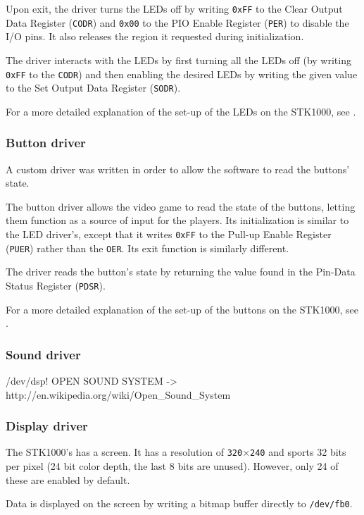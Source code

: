 		Upon exit, the driver turns the LEDs off by writing \texttt{0xFF} to the Clear Output Data Register (\texttt{CODR}) and \texttt{0x00} to the PIO Enable Register (\texttt{PER}) to disable the I/O pins.
		It also releases the region it requested during initialization.

		The driver interacts with the LEDs by first turning all the LEDs off (by writing \texttt{0xFF} to the \texttt{CODR}) and then enabling the desired LEDs by writing the given value to the Set Output Data Register (\texttt{SODR}).


		For a more detailed explanation of the set-up of the LEDs on the STK1000, see \cite{tdt4258-1}.
	\subsubsection{Button driver}
		A custom driver was written in order to allow the software to read the buttons' state.

		The button driver allows the video game to read the state of the buttons, letting them function as a source of input for the players.
		Its initialization is similar to the LED driver's, except that it writes \texttt{0xFF} to the Pull-up Enable Register (\texttt{PUER}) rather than the \texttt{OER}.
		Its exit function is similarly different.

		The driver reads the button's state by returning the value found in the Pin-Data Status Register (\texttt{PDSR}).


		For a more detailed explanation of the set-up of the buttons on the STK1000, see \cite{tdt4258-1}.	
	\subsubsection{Sound driver}
		/dev/dsp!
		OPEN SOUND SYSTEM -> http://en.wikipedia.org/wiki/Open_Sound_System
	\subsubsection{Display driver}
		The STK1000's has a screen.
		It has a resolution of \texttt{320}$\times$\texttt{240} and sports 32 bits per pixel (24 bit color depth, the last 8 bits are unused)\cite{lab-compendium}.
		However, only 24 of these are enabled by default\cite{avr32-disp}.

		Data is displayed on the screen by writing a bitmap buffer directly to \texttt{/dev/fb0}.


